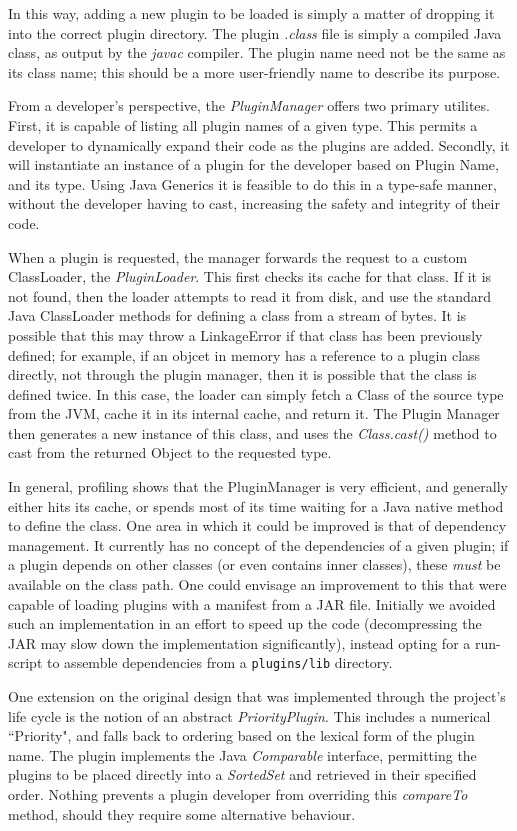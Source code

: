 \documentclass{acm_proc_article-sp}
\begin{document}
{In this way, adding a new plugin to be loaded is simply a matter of dropping it into the correct plugin directory. The plugin {\textit{.class}} file is simply a compiled Java class, as output by the {\textit{javac}} compiler. The plugin name need not be the same as its class name; this should be a more user{}-friendly name to describe its purpose.

From a developer's perspective, the {\textit{PluginManager}} offers two primary utilites. First, it is capable of listing all plugin names of a given type. This permits a developer to dynamically expand their code as the plugins are added. Secondly, it will instantiate an instance of a plugin for the developer based on Plugin Name, and its type. Using Java Generics it is feasible to do this in a type-safe manner, without the developer having to cast, increasing the safety and integrity of their code.

When a plugin is requested, the manager forwards the request to a custom ClassLoader, the {\textit{PluginLoader}}. This first checks its cache for that class. If it is not found, then the loader attempts to read it from disk, and use the standard Java ClassLoader methods for defining a class from a stream of bytes. It is possible that this may throw a LinkageError if that class has been previously defined; for example, if an objcet in memory has a reference to a plugin class directly, not through the plugin manager, then it is possible that the class is defined twice. In this case, the loader can simply fetch a Class of the source type from the JVM, cache it in its internal cache, and return it. The Plugin Manager then generates a new instance of this class, and uses the {\textit{Class.cast()}} method to cast from the returned Object to the requested type.

In general, profiling shows that the PluginManager is very efficient, and generally either hits its cache, or spends most of its time waiting for a Java native method to define the class. One area in which it could be improved is that of dependency management. It currently has no concept of the dependencies of a given plugin; if a plugin depends on other classes (or even contains inner classes), these {\textit{must}} be available on the class path. One could envisage an improvement to this that were capable of loading plugins with a manifest from a JAR file. Initially we avoided such an implementation in an effort to speed up the code (decompressing the JAR may slow down the implementation significantly), instead opting for a run{}-script to assemble dependencies from a {\texttt{plugins/lib}} directory.

One extension on the original design that was implemented through the project's life cycle is the notion of an abstract {\textit{PriorityPlugin}}. This includes a numerical ``Priority", and falls back to ordering based on the lexical form of the plugin name. The plugin implements the Java {\textit{Comparable}} interface, permitting the plugins to be placed directly into a {\textit{SortedSet}} and retrieved in their specified order. Nothing prevents a plugin developer from overriding this {\textit{compareTo}} method, should they require some alternative behaviour.
}
\end{document}
